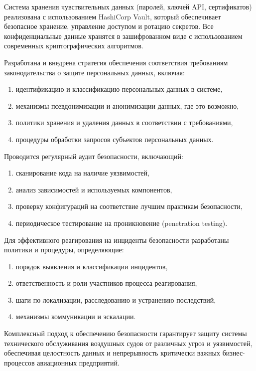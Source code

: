 \documentclass[14pt,a4paper]{extarticle}
\begin{document}
Система хранения чувствительных данных (паролей, ключей API, сертификатов) реализована с использованием HashiCorp Vault, который обеспечивает безопасное хранение, управление доступом и ротацию секретов. Все конфиденциальные данные хранятся в зашифрованном виде с использованием современных криптографических алгоритмов.

Разработана и внедрена стратегия обеспечения соответствия требованиям законодательства о защите персональных данных, включая:

\begin{enumerate}
\item идентификацию и классификацию персональных данных в системе,
\item механизмы псевдонимизации и анонимизации данных, где это возможно,
\item политики хранения и удаления данных в соответствии с требованиями,
\item процедуры обработки запросов субъектов персональных данных.
\end{enumerate}

Проводится регулярный аудит безопасности, включающий:

\begin{enumerate}
\item сканирование кода на наличие уязвимостей,
\item анализ зависимостей и используемых компонентов,
\item проверку конфигураций на соответствие лучшим практикам безопасности,
\item периодическое тестирование на проникновение (penetration testing).
\end{enumerate}

Для эффективного реагирования на инциденты безопасности разработаны политики и процедуры, определяющие:

\begin{enumerate}
\item порядок выявления и классификации инцидентов,
\item ответственность и роли участников процесса реагирования,
\item шаги по локализации, расследованию и устранению последствий,
\item механизмы коммуникации и эскалации.
\end{enumerate}

Комплексный подход к обеспечению безопасности гарантирует защиту системы технического обслуживания воздушных судов от различных угроз и уязвимостей, обеспечивая целостность данных и непрерывность критически важных бизнес-процессов авиационных предприятий.
\end{document}
